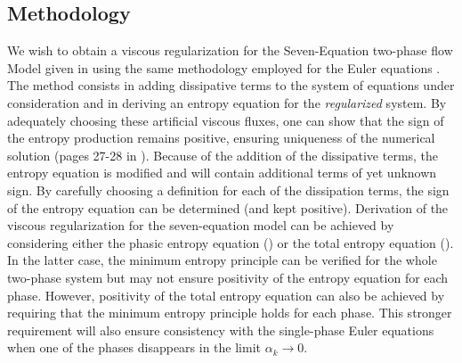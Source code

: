 \documentclass[preprint,10pt]{elsarticle}
\begin{document}
\subsection{Methodology}
%
We wish to obtain a viscous regularization for the Seven-Equation two-phase flow Model given in  using the same methodology 
employed for the Euler equations \cite{jlg, Marco_paper_low_mach}. The method consists in adding dissipative terms to the system of equations under 
consideration and in deriving an entropy equation for the {\it regularized} system. By adequately choosing these artificial viscous fluxes, one can 
show that the sign of the entropy production remains positive, ensuring uniqueness of the numerical solution (pages 27-28 in \cite{Leveque}). Because 
of the addition of the dissipative terms, the entropy equation is modified and will contain additional terms of yet unknown sign. By carefully choosing 
a definition for each of the dissipation terms, the sign of the entropy equation can be determined (and kept positive). Derivation of the viscous 
regularization for the seven-equation model can be achieved by considering either the phasic entropy equation () or the 
total entropy equation (). In the latter case, the minimum entropy principle can be verified for the whole two-phase system 
but may not ensure positivity of the entropy equation for each phase. However, positivity of the total entropy equation can also be achieved by requiring 
that the minimum entropy principle holds for each phase. This stronger requirement will also ensure consistency with the single-phase Euler equations when 
one of the phases disappears in the limit $\alpha_k \to 0$. 
%
\end{document}
